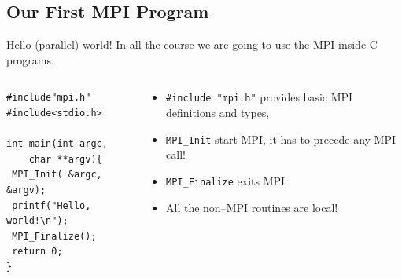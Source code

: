 \documentclass{beamer}
\begin{document}
\subsection{Our First MPI Program}

\begin{frame}[fragile]{Hello (parallel) world!}
In all the course we are going to use the MPI inside C programs.
\begin{columns}
\begin{column}{0.4\columnwidth}
\begin{verbatim}
#include"mpi.h"
#include<stdio.h>

int main(int argc, 
	char **argv){
 MPI_Init( &argc, &argv);
 printf("Hello, world!\n");
 MPI_Finalize();
 return 0;
}
\end{verbatim}
\end{column}
\begin{column}{0.56\columnwidth}
\small
\begin{itemize}
	\item \texttt{#include "mpi.h"} provides basic MPI definitions and types,
	\item \texttt{MPI_Init} start MPI, it has to precede any MPI call!
	\item \texttt{MPI_Finalize} exits MPI
	\item All the non--MPI routines are local!
\end{itemize}
\end{column}
\end{columns}
\vfill
{}
\end{frame}
\end{document}
